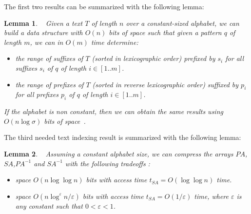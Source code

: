 \documentclass{article}
\newcommand{\?}{\mskip1.5mu}
\renewcommand{\epsilon}{\varepsilon}
\newtheorem{lemma}{Lemma}
\begin{document}
The first two results can be summarized with the following lemma:
\begin{lemma}~\cite{FM05}
Given a text $T$ of length $n$ over a constant-sized alphabet, we can build a data structure with $O(n)$ bits of space such that given a pattern $q$ of length $m$, we can in $O(m)$ time determine:
\begin{itemize}
\item the range of suffixes of $T$ (sorted in lexicographic order) prefixed by $s_i$ for all suffixes $s_i$ of $q$ of length $i\in[1..m]$.
\item the range of prefixes of $T$ (sorted in reverse lexicographic order) suffixed by $p_i$ for all prefixes $p_i$ of $q$ of length $i\in[1..m]$.
\end{itemize}
If the alphabet is non constant, then we can obtain the same results using $O(n\log\sigma)$ bits of space~\cite{BN11}. 
\end{lemma}
The third needed text indexing result is summarized with the following lemma:
\begin{lemma}~\cite{GV05,Rao02,LSW05}
\label{lemma:compr_suf_array}
Assuming a constant alphabet size, we can compress the arrays $PA$,$SA$,$PA^{-1}$ and $SA^{-1}$ with the following tradeoffs : 
\begin{itemize}
\item space $O(n\log\log n)$ bits with access time $t_{SA}=O(\log\log n)$ time. 
\item space $O(n\log^\epsilon n/\epsilon)$ bits with access time $t_{SA}=O(1/\epsilon)$ time, where $\epsilon$ is any constant
such that $0<\epsilon<1$. 
\end{itemize}
\end{lemma}
\end{document}
